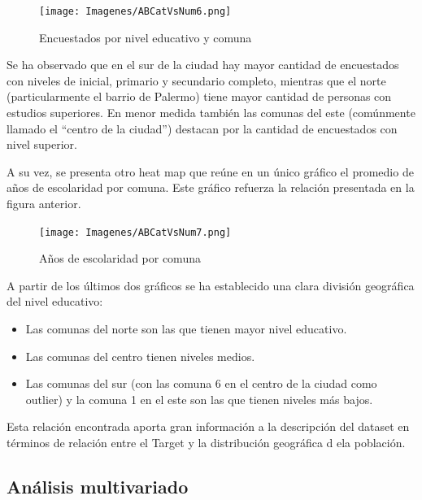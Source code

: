 \documentclass[a4paper]{article}
\begin{document}
            \begin{figure}[H]
            \centering
                \texttt{[image: Imagenes/ABCatVsNum6.png]}
                \caption{Encuestados por nivel educativo y comuna}
                \label{AB education level and location}
            \end{figure}
 
            Se ha observado que en el sur de la ciudad hay  mayor cantidad de encuestados con niveles de inicial, primario y secundario completo, mientras que el norte (particularmente el barrio de Palermo) tiene mayor cantidad de personas con estudios superiores. En menor medida también las comunas del este (comúnmente llamado el ``centro de la ciudad'') destacan por la cantidad de encuestados con nivel superior.

            A su vez, se presenta otro heat map que reúne en un único gráfico el promedio de años de escolaridad por comuna. Este gráfico refuerza la relación presentada en la figura anterior.

            \begin{figure}[H]
            \centering
                \texttt{[image: Imagenes/ABCatVsNum7.png]}
                \caption{Años de escolaridad por comuna}
                \label{AB years of education and location}
            \end{figure}
 
            A partir de los últimos dos gráficos se ha establecido una clara división geográfica del nivel educativo:
            \begin{itemize}
                \item Las comunas del norte son las que tienen mayor nivel educativo.
                \item Las comunas del centro tienen niveles medios.
                \item Las comunas del sur (con las comuna 6 en el centro de la ciudad como outlier) y la comuna 1 en el este son las que tienen niveles más bajos.
            \end{itemize}

            Esta relación encontrada aporta gran información a la descripción del dataset en términos de relación entre el Target y la distribución geográfica d ela población.
    
    \newpage
    
    \subsection{Análisis multivariado}
 
\end{document}

